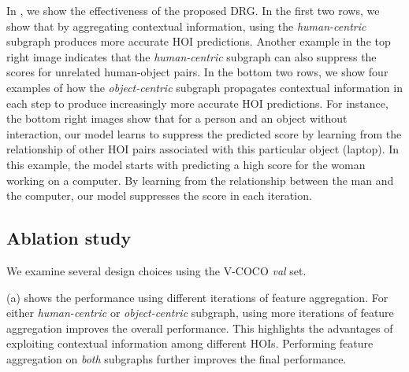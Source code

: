 \vspace{-2.0mm}







































In , we show the effectiveness of the proposed DRG. 
In the first two rows, we show that by aggregating contextual information, using the  \emph{human-centric} subgraph produces more accurate HOI predictions.
Another example in the top right image indicates that the \emph{human-centric} subgraph can also suppress the scores for unrelated human-object pairs. 
In the bottom two rows, we show four examples of how the \emph{object-centric} subgraph propagates contextual information in each step to produce increasingly more accurate HOI predictions.
For instance, the bottom right images show that for a person and an object without interaction, our model learns to suppress the predicted score by learning from the relationship of other HOI pairs associated with this particular object (laptop). 
In this example, the model starts with predicting a high score for the woman working on a computer. 
By learning from the relationship between the man and the computer, our model suppresses the score in each iteration.







\subsection{Ablation study}
\label{sec:ablation}
We examine several design choices using the V-COCO \emph{val} set.

(a) shows the performance using different iterations of feature aggregation.
For either \emph{human-centric} or \emph{object-centric} subgraph, using more iterations of feature aggregation improves the overall performance.
This highlights the advantages of exploiting contextual information among different HOIs.
Performing feature aggregation on \emph{both} subgraphs further improves the final performance.

